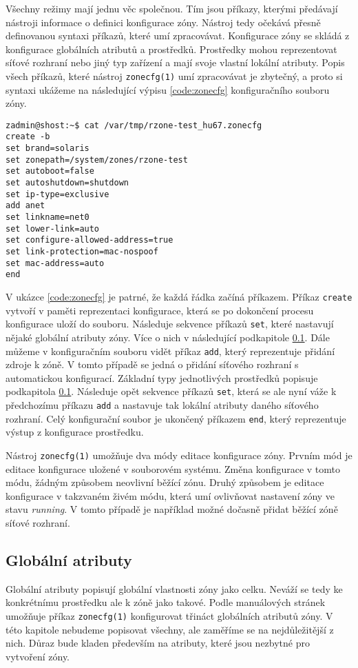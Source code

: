 Všechny režimy mají jednu věc společnou. Tím jsou příkazy, kterými předávají nástroji informace o definici konfigurace zóny.
Nástroj tedy očekává přesně definovanou syntaxi příkazů, které umí zpracovávat. Konfigurace zóny se skládá z konfigurace 
globálních atributů a prostředků. Prostředky mohou reprezentovat síťové rozhraní nebo jiný typ zařízení a mají svoje vlastní
lokální atributy. Popis všech příkazů, které nástroj \verb|zonecfg(1)| umí zpracovávat je zbytečný, a proto si syntaxi
ukážeme na následující výpisu \ref{code:zonecfg} konfiguračního souboru zóny.
\begin{lstlisting}[caption={Ukázka konfigurace zóny}, float, label={code:zonecfg}]
zadmin@shost:~$ cat /var/tmp/rzone-test_hu67.zonecfg
create -b
set brand=solaris
set zonepath=/system/zones/rzone-test
set autoboot=false
set autoshutdown=shutdown
set ip-type=exclusive
add anet
set linkname=net0
set lower-link=auto
set configure-allowed-address=true
set link-protection=mac-nospoof
set mac-address=auto
end
\end{lstlisting}
V ukázce \ref{code:zonecfg} je patrné, že každá řádka začíná příkazem. Příkaz \verb|create| vytvoří v paměti reprezentaci
konfigurace, která se po dokončení procesu konfigurace uloží do souboru. Následuje sekvence příkazů \verb|set|, které nastavují
nějaké globální atributy zóny. Více o nich v následující podkapitole \ref{chapter:zones:configuration:global_attributes}. Dále
můžeme v konfiguračním souboru vidět příkaz \verb|add|, který reprezentuje přidání zdroje k zóně. V tomto případě se jedná
o přidání síťového rozhraní s automatickou konfigurací. Základní typy jednotlivých prostředků popisuje podkapitola 
\ref{chapter:zones:configuration:global_attributes}. Následuje opět sekvence příkazů \verb|set|, která se ale nyní váže
k předchozímu příkazu \verb|add| a nastavuje tak lokální atributy daného síťového rozhraní. Celý konfigurační soubor je ukončený
příkazem \verb|end|, který reprezentuje výstup z konfigurace prostředku.

Nástroj \verb|zonecfg(1)| umožňuje dva módy editace konfigurace zóny. Prvním mód je editace konfigurace uložené v souborovém
systému. Změna konfigurace v tomto módu, žádným způsobem neovlivní běžící zónu. Druhý způsobem je editace konfigurace v takzvaném
živém módu, která umí ovlivňovat nastavení zóny ve stavu \textit{running}. V tomto případě je například možné dočasně přidat
běžící zóně síťové rozhraní.
\subsection{Globální atributy}
\label{chapter:zones:configuration:global_attributes}
Globální atributy popisují globální vlastnosti zóny jako celku. Neváží se tedy ke konkrétnímu prostředku ale k zóně jako takové.
Podle manuálových stránek \cite{oracle:manpages:zonecfg} umožňuje příkaz \verb|zonecfg(1)| konfigurovat třináct globálních
atributů zóny. V této kapitole nebudeme popisovat všechny, ale zaměříme se na nejdůležitější z nich. Důraz bude kladen především
na atributy, které jsou nezbytné pro vytvoření zóny.
